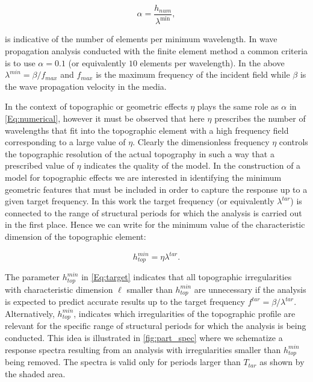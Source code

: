 \documentclass[11pt,letterpaper]{article}
\begin{document}
\begin{equation}
\alpha  = \frac{{{h_{num}}}}{{{\lambda ^{\min }}}},
\label{Eq:numerical}
\end{equation}

is indicative of the number of elements per minimum wavelength. In wave propagation analysis conducted with the finite element method a common criteria is to use $\alpha = 0.1$ (or equivalently $10$ elements per wavelength). In the above $\lambda^{min} = \beta / f_{max}$ and $f_{max}$ is the maximum frequency of the incident field while $\beta$ is the wave propagation velocity in the media.

In the context of topographic or geometric effects $\eta$ plays the same role as $\alpha$ in \cref{Eq:numerical}, however it must be observed that here $\eta$ prescribes the number of wavelengths that fit into the topographic element with a high frequency field corresponding to a large value of $\eta$. Clearly the dimensionless frequency $\eta$ controls the topographic resolution of the actual topography in such a way that a prescribed value of $\eta$ indicates the quality of the model. In the construction of a model for topographic effects we are interested in identifying the minimum geometric features that must be included in order to capture the response up to a given target frequency. In this work the target frequency (or equivalently $\lambda^{tar}$) is connected to the range of structural periods for which the analysis is carried out in the first place. Hence we can write for the minimum value of the characteristic dimension of the topographic element:

\begin{equation}
h_{top}^{min} = \eta \lambda^{tar}.
\label{Eq:target}
\end{equation}

The parameter $h_{top}^{min}$ in \cref{Eq:target} indicates that all topographic irregularities with characteristic dimension $\ell $ smaller than $h_{top}^{min}$ are unnecessary if the analysis is expected to predict accurate results up to the target frequency  $f^{tar} = \beta / {\lambda ^{tar }}$. Alternatively, $h_{top}^{min}$, indicates which irregularities of the topographic profile are relevant for the specific range of structural periods for which the analysis is being conducted. This idea is illustrated in \cref{fig:part_spec} where we schematize a response spectra resulting from an analysis with irregularities smaller than $h_{top}^{min}$ being removed. The spectra is valid only for periods larger than ${T_{tar}}$ as shown by the shaded area.
\end{document}
